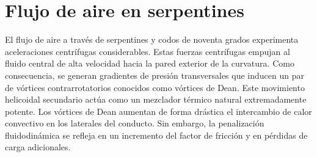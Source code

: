 \section{Flujo de aire en serpentines}
\label{sec:cap02_flujo_serpentines}

El flujo de aire a través de serpentines y codos de noventa grados experimenta aceleraciones centrífugas considerables.
Estas fuerzas centrífugas empujan al fluido central de alta velocidad hacia la pared exterior de la curvatura.
Como consecuencia, se generan gradientes de presión transversales que inducen un par de vórtices contrarrotatorios conocidos como vórtices de Dean.
Este movimiento helicoidal secundario actúa como un mezclador térmico natural extremadamente potente.
Los vórtices de Dean aumentan de forma drástica el intercambio de calor convectivo en los laterales del conducto.
Sin embargo, la penalización fluidodinámica se refleja en un incremento del factor de fricción y en pérdidas de carga adicionales.
